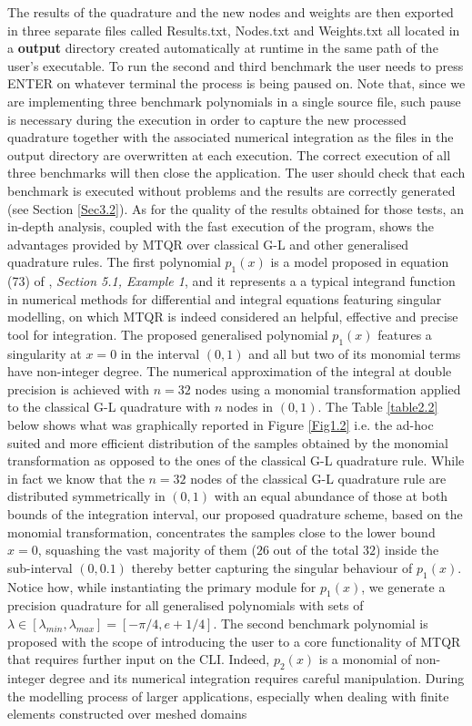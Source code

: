\documentclass[a4paper, twosided]{book}
\begin{document}
\noindent
The results of the quadrature and the new nodes and weights are then exported in three separate files called \colorbox{poliGrayBlue}{Results.txt}, \colorbox{poliGrayBlue}{Nodes.txt} and \colorbox{poliGrayBlue}{Weights.txt} all located in a \colorbox{poliGrayBlue}{\textbf{output}} directory created automatically at runtime in the same path of the user’s executable. To run the second and third benchmark the user needs to press \colorbox{poliGrayBlue}{ENTER} on whatever terminal the process is being paused on. Note that, since we are implementing three benchmark polynomials in a single source file, such pause is necessary during the execution in order to capture the new processed quadrature together with the associated numerical integration as the files in the output directory are overwritten at each execution. The correct execution of all three benchmarks will then close the application. The user should check that each benchmark is executed without problems and the results are correctly generated (see Section \ref{Sec3.2}). As for the quality of the results obtained for those tests, an in-depth analysis, coupled with the fast execution of the program, shows the advantages provided by MTQR over classical G-L and other generalised quadrature rules. The first polynomial $p_1(x)$ is a model proposed in equation (73) of \cite{Lombardi09}, \textsl{Section 5.1, Example 1}, and it represents a a typical integrand function in numerical methods for differential and integral equations featuring singular modelling, on which MTQR is indeed considered an helpful, effective and precise tool for integration. The proposed generalised polynomial $p_1(x)$ features a singularity at $x=0$ in the interval $(0,1)$ and all but two of its monomial terms have non-integer degree. The numerical approximation of the integral at double precision is achieved with $n=32$ nodes using a monomial transformation applied to the classical G-L quadrature with $n$ nodes in $(0,1)$. The Table \ref{table2.2} below shows what was graphically reported in Figure \ref{Fig1.2} i.e. the ad-hoc suited and more efficient distribution of the samples obtained by the monomial transformation as opposed to the ones of the classical G-L quadrature rule. While in fact we know that the $n=32$ nodes of the classical G-L quadrature rule are distributed symmetrically in $(0,1)$ with an equal abundance of those at both bounds of the integration interval, our proposed quadrature scheme, based on the monomial transformation, concentrates the samples close to the lower bound $x=0$, squashing the vast majority of them ($26$ out of the total $32$) inside the sub-interval $(0,0.1)$ thereby better capturing the singular behaviour of $p_1(x)$. Notice how, while instantiating the primary module for $p_1(x)$, we generate a precision quadrature for all generalised polynomials with sets of $\lambda \in [\lambda_{min},\lambda_{max}]=[-\pi/4,e+1/4]$. The second benchmark polynomial is proposed with the scope of introducing the user to a core functionality of MTQR that requires further input on the CLI. Indeed, $p_2(x)$ is a monomial of non-integer degree and its numerical integration requires careful manipulation. During the modelling process of larger applications, especially when dealing with finite elements constructed over meshed domains 
\end{document}
